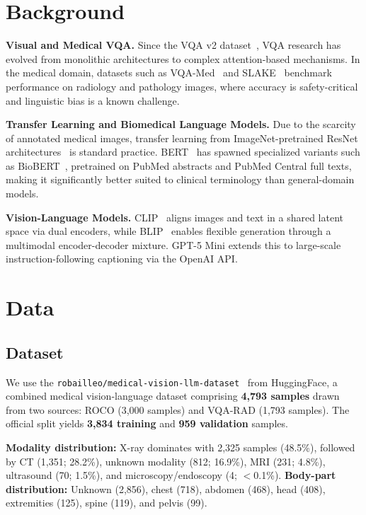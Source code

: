 \documentclass{article}
\begin{document}
\section{Background}
\label{sec:background}

\textbf{Visual and Medical VQA.}
Since the VQA v2 dataset~\cite{goyal2017making}, VQA research has evolved from
monolithic architectures to complex attention-based mechanisms. In the medical
domain, datasets such as VQA-Med~\cite{lau2018dataset} and
SLAKE~\cite{liu2021slake} benchmark performance on radiology and pathology
images, where accuracy is safety-critical and linguistic bias is a known
challenge.

\textbf{Transfer Learning and Biomedical Language Models.}
Due to the scarcity of annotated medical images, transfer learning from
ImageNet-pretrained ResNet architectures~\cite{he2016resnet} is standard
practice. BERT~\cite{devlin2018bert} has spawned specialized variants such as
BioBERT~\cite{lee2020biobert}, pretrained on PubMed abstracts and PubMed
Central full texts, making it significantly better suited to clinical
terminology than general-domain models.

\textbf{Vision-Language Models.}
CLIP~\cite{radford2021clip} aligns images and text in a shared latent space
via dual encoders, while BLIP~\cite{li2022blip} enables flexible generation
through a multimodal encoder-decoder mixture. GPT-5 Mini extends this to
large-scale instruction-following captioning via the OpenAI API.


\section{Data}
\label{sec:data}


\subsection{Dataset}
We use the \texttt{robailleo/medical-vision-llm-dataset}~\cite{robailleo2024}
from HuggingFace, a combined medical vision-language dataset comprising
\textbf{4,793 samples} drawn from two sources: ROCO (3,000 samples) and
VQA-RAD (1,793 samples). The official split yields \textbf{3,834 training} and
\textbf{959 validation} samples.

\textbf{Modality distribution:} X-ray dominates with 2,325 samples (48.5\%),
followed by CT (1,351; 28.2\%), unknown modality (812; 16.9\%), MRI (231;
4.8\%), ultrasound (70; 1.5\%), and microscopy/endoscopy (4; $<$0.1\%).
\textbf{Body-part distribution:} Unknown (2,856), chest (718), abdomen (468),
head (408), extremities (125), spine (119), and pelvis (99).
\end{document}

